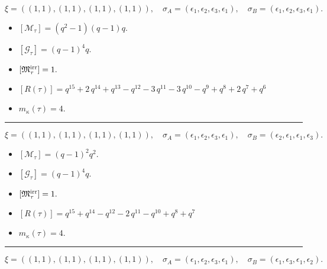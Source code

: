\documentclass[10pt,a4paper]{amsart}
\begin{document}
$$\xi = ({(1, 1), (1, 1)}, {(1, 1)}, {(1, 1)}),\quad \sigma_A = ({{\epsilon_1}, {\epsilon_2}}, {{\epsilon_3}}, {{\epsilon_1}}),\quad \sigma_B = ({{\epsilon_1}, {\epsilon_2}}, {{\epsilon_3}}, {{\epsilon_1}}).$$

\begin{itemize}
 \item $[\mathcal{M}_{\tau}] = {\left(q^{2} - 1\right)} {\left(q - 1\right)} q .$

 \item $[\mathcal{G}_{\tau}] = {\left(q - 1\right)}^{4} q .$

 \item $[{\frak M}_{\tau}^{\textrm{irr}}] = 1 .$

 \item $[R(\tau)] = q^{15} + 2 \, q^{14} + q^{13} - q^{12} - 3 \, q^{11} - 3 \, q^{10} - q^{9} + q^{8} + 2 \, q^{7} + q^{6} $

 \item $m_{\kappa}(\tau) = 4 .$

 \end{itemize}
\noindent\rule{8cm}{0.4pt}

$$\xi = ({(1, 1), (1, 1)}, {(1, 1)}, {(1, 1)}),\quad \sigma_A = ({{\epsilon_1}, {\epsilon_2}}, {{\epsilon_3}}, {{\epsilon_1}}),\quad \sigma_B = ({{\epsilon_2}, {\epsilon_1}}, {{\epsilon_1}}, {{\epsilon_3}}).$$

\begin{itemize}
 \item $[\mathcal{M}_{\tau}] = {\left(q - 1\right)}^{2} q^{2} .$

 \item $[\mathcal{G}_{\tau}] = {\left(q - 1\right)}^{4} q .$

 \item $[{\frak M}_{\tau}^{\textrm{irr}}] = 1 .$

 \item $[R(\tau)] = q^{15} + q^{14} - q^{12} - 2 \, q^{11} - q^{10} + q^{8} + q^{7} $

 \item $m_{\kappa}(\tau) = 4 .$

 \end{itemize}
\noindent\rule{8cm}{0.4pt}

$$\xi = ({(1, 1), (1, 1)}, {(1, 1)}, {(1, 1)}),\quad \sigma_A = ({{\epsilon_1}, {\epsilon_2}}, {{\epsilon_3}}, {{\epsilon_1}}),\quad \sigma_B = ({{\epsilon_1}, {\epsilon_3}}, {{\epsilon_1}}, {{\epsilon_2}}).$$
\end{document}
